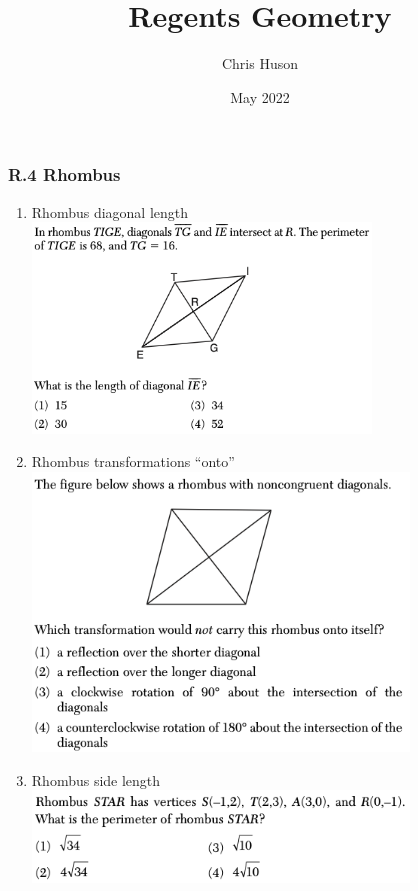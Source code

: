 \documentclass[12pt, oneside]{article}
\title{Regents Geometry}
\author{Chris Huson}
\date{May 2022}
\begin{document}
\subsubsection*{R.4 Rhombus}
\begin{enumerate}
\item Rhombus diagonal length\\
\includegraphics[width=9cm]{R-4images/R-4RhombusH.png}
\vspace{1cm}

\item Rhombus transformations ``onto''\\
\includegraphics[width=10cm]{R-4images/R-4RhombusF.png}

\item Rhombus side length\\
\includegraphics[width=10cm]{R-4images/R-4RhombusE.png}


\end{enumerate}
\end{document}
